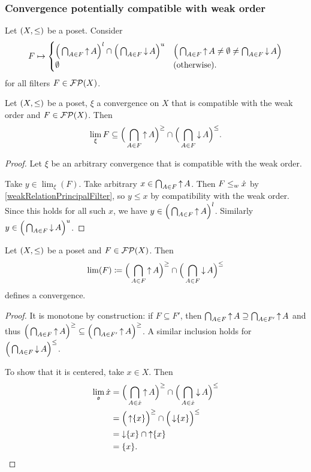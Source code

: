 \subsubsection{Convergence potentially compatible with weak order}
\begin{definition}
Let $\sSet{X,\leq}$ be a poset. Consider
\[ F \mapsto \begin{cases}
\Big(\bigcap_{A\in F}\operatorname{\uparrow} A\Big)^l \cap \Big(\bigcap_{A\in F}\operatorname{\downarrow} A\Big)^u & \Big(\bigcap_{A\in F}\operatorname{\uparrow} A \neq \emptyset \neq \bigcap_{A\in F}\operatorname{\downarrow} A\Big) \\
\emptyset & (\text{otherwise}).
\end{cases} \]
for all filters $F\in \operatorname{\mathcal{FP}}(X)$.
\end{definition}

\begin{proposition} \label{necessityWeakOrderConvergence}
Let $\sSet{X,\leq}$ be a poset, $\xi$ a convergence on $X$ that is compatible with the weak order and $F\in \operatorname{\mathcal{FP}}(X)$. Then
\[ \lim_\xi F \subseteq \Big(\bigcap_{A\in F}\operatorname{\uparrow} A\Big)^\geq \cap \Big(\bigcap_{A\in F}\operatorname{\downarrow} A\Big)^\leq. \]
\end{proposition}
\begin{proof}
Let $\xi$ be an arbitrary convergence that is compatible with the weak order.

Take $y\in \lim_\xi(F)$. Take arbitrary $x\in \bigcap_{A\in F}\operatorname{\uparrow} A$. Then $F \leq_w \dot{x}$ by \ref{weakRelationPrincipalFilter}, so $y\leq x$ by compatibility with the weak order. Since this holds for all such $x$, we have $y\in \Big(\bigcap_{A\in F}\operatorname{\uparrow} A\Big)^l$. Similarly $y\in \Big(\bigcap_{A\in F}\operatorname{\downarrow} A\Big)^u$.
\end{proof}


\begin{lemma} \label{potentialWeakOrderConvergence}
Let $\sSet{X,\leq}$ be a poset and $F\in \operatorname{\mathcal{FP}}(X)$. Then
\[ \lim(F) \coloneqq \Big(\bigcap_{A\in F}\operatorname{\uparrow} A\Big)^\geq \cap \Big(\bigcap_{A\in F}\operatorname{\downarrow} A\Big)^\leq \]
defines a convergence.
\end{lemma}
\begin{proof}
It is monotone by construction: if $F\subseteq F'$, then $\bigcap_{A\in F}\operatorname{\uparrow} A \supseteq \bigcap_{A\in F'}\operatorname{\uparrow} A$ and thus $\Big(\bigcap_{A\in F}\operatorname{\uparrow} A\Big)^\geq \subseteq \Big(\bigcap_{A\in F'}\operatorname{\uparrow} A\Big)^\geq$. A similar inclusion holds for $\Big(\bigcap_{A\in F}\operatorname{\downarrow} A\Big)^\leq$.

To show that it is centered, take $x\in X$. Then
\begin{align*}
\lim_\mathfrak{o}\dot{x} &= \Big(\bigcap_{A\in \dot{x}}\operatorname{\uparrow} A\Big)^\geq \cap \Big(\bigcap_{A\in \dot{x}}\operatorname{\downarrow} A\Big)^\leq \\
&= \Big(\operatorname{\uparrow} \{x\}\Big)^\geq \cap \Big(\operatorname{\downarrow} \{x\}\Big)^\leq \\
&= \operatorname{\downarrow} \{x\} \cap \operatorname{\uparrow} \{x\} \\
&= \{x\}.
\end{align*}
\end{proof}

